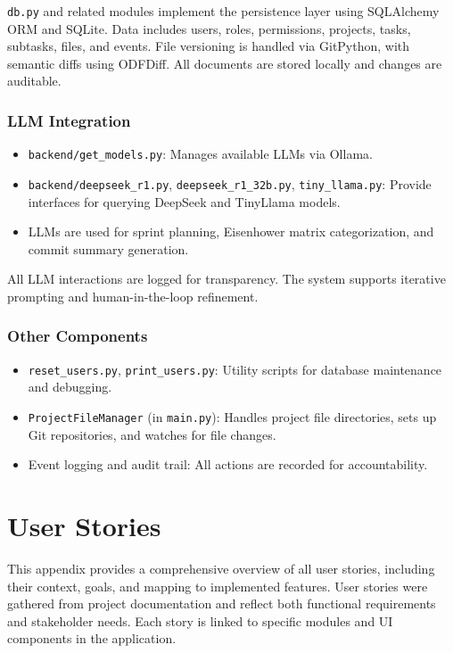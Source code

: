 \documentclass{report}
\begin{document}
\texttt{db.py} and related modules implement the persistence layer using SQLAlchemy ORM and SQLite. Data includes users, roles, permissions, projects, tasks, subtasks, files, and events. File versioning is handled via GitPython, with semantic diffs using ODFDiff. All documents are stored locally and changes are auditable.

\subsection*{LLM Integration}
\begin{itemize}
    \item \texttt{backend/get\_models.py}: Manages available LLMs via Ollama.
    \item \texttt{backend/deepseek\_r1.py}, \texttt{deepseek\_r1\_32b.py}, \texttt{tiny\_llama.py}: Provide interfaces for querying DeepSeek and TinyLlama models.
    \item LLMs are used for sprint planning, Eisenhower matrix categorization, and commit summary generation.
\end{itemize}

All LLM interactions are logged for transparency. The system supports iterative prompting and human-in-the-loop refinement.

\subsection*{Other Components}
\begin{itemize}
    \item \texttt{reset\_users.py}, \texttt{print\_users.py}: Utility scripts for database maintenance and debugging.
    \item \texttt{ProjectFileManager} (in \texttt{main.py}): Handles project file directories, sets up Git repositories, and watches for file changes.
    \item Event logging and audit trail: All actions are recorded for accountability.
\end{itemize}



\chapter{User Stories}\label{UserStories}
This appendix provides a comprehensive overview of all user stories, including their context, goals, and mapping to implemented features. User stories were gathered from project documentation and reflect both functional requirements and stakeholder needs. Each story is linked to specific modules and UI components in the application.
\end{document}
